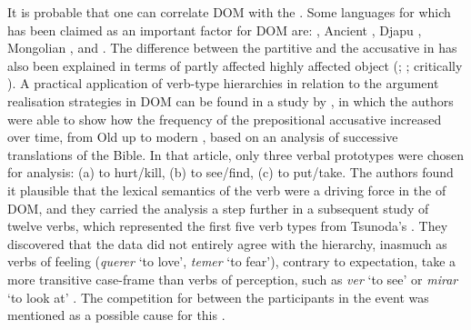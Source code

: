 \documentclass[output=paper]{LSP/langsci}
\begin{document}
It is probable that one can correlate DOM with the . Some languages for which  has been claimed as an important factor for DOM are:  \citep{Kratochvil2014Differential}, Ancient  \citep{Riano2014Differential}, Djapu \citep[205]{Naess2007Prototypical}, Mongolian \citep[64–65]{Guntsetseg2008Differential}, and  \citep{vonHeusingeretal2003Interaction,vonHeusingeretal2011Affectedness}. 
The difference between the partitive and the accusative in  has also been explained in terms of partly affected \vs highly affected object (\citealt[262]{Hopperetal1980Transitivity}; \citealt[1203]{Naess2004What}; critically \citealt[381]{Iemmolo2013Symmetric}). 
A practical application of verb-type hierarchies in relation to the argument realisation strategies in DOM can be found in a study by \citet{vonHeusingeretal2007Differential}, in which the authors were able to show how the frequency of the prepositional accusative increased over time, from Old  up to modern , based on an analysis of successive translations of the Bible. 
In that article, only three verbal prototypes were chosen for analysis: (a) to hurt/kill, (b) to see/find, (c) to put/take. The authors found it plausible that the lexical semantics of the verb were a driving force in the  of  DOM, and they carried the analysis a step further in a subsequent study of twelve verbs, which represented the first five verb types from Tsunoda’s  \citep{vonHeusingeretal2011Affectedness}. 
They discovered that the  data did not entirely agree with the hierarchy, inasmuch as verbs of feeling (\textit{querer} ‘to love’, \textit{temer} ‘to fear’), contrary to expectation, take a more transitive case-frame than verbs of perception, such as \textit{ver} ‘to see’ or \textit{mirar} ‘to look at’ \citep[612]{vonHeusingeretal2011Affectedness}. 
The competition for  between the participants in the event was mentioned as a possible cause for this \citep[613]{vonHeusingeretal2011Affectedness}.
\end{document}
